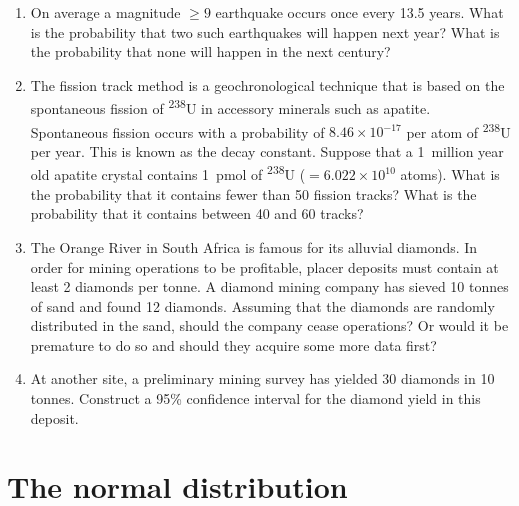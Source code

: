 \begin{enumerate}
  
\item On average a magnitude $\geq{9}$ earthquake occurs once every
  13.5 years. What is the probability that two such earthquakes will
  happen next year?  What is the probability that none will happen in
  the next century?

\item The fission track method is a geochronological technique that is
  based on the spontaneous fission of \textsuperscript{238}U in
  accessory minerals such as apatite. Spontaneous fission occurs with
  a probability of $8.46\times{10}^{-17}$ per atom of
  \textsuperscript{238}U per year. This is known as the decay
  constant. Suppose that a 1~million year old apatite crystal contains
  1~pmol of \textsuperscript{238}U ($=6.022\times{10}^{10}$
  atoms). What is the probability that it contains fewer than 50
  fission tracks? What is the probability that it contains between 40
  and 60 tracks?
  
\item The Orange River in South Africa is famous for its alluvial
  diamonds. In order for mining operations to be profitable, placer
  deposits must contain at least 2 diamonds per tonne.  A diamond
  mining company has sieved 10 tonnes of sand and found 12
  diamonds. Assuming that the diamonds are randomly distributed in the
  sand, should the company cease operations? Or would it be premature
  to do so and should they acquire some more data first?

\item At another site, a preliminary mining survey has yielded 30
  diamonds in 10 tonnes. Construct a 95\% confidence interval for the
  diamond yield in this deposit.
  
\end{enumerate}

\section{The normal distribution}
\label{sec:ex-gauss}

